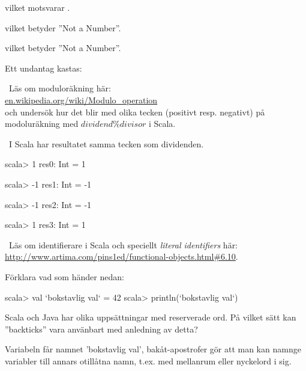 \SubtaskSolved {} vilket motsvarar .

\SubtaskSolved {} vilket betyder ''Not a Number''.

\SubtaskSolved {} vilket betyder ''Not a Number''.

\SubtaskSolved Ett undantag kastas: 

\QUESTEND




\QUESTBEGIN

\Task\Uberkurs \what~Läs om moduloräkning här: \\
 \href{https://en.wikipedia.org/wiki/Modulo\_operation}{en.wikipedia.org/wiki/Modulo\_operation} \\
 och undersök hur det blir med olika tecken (positivt resp. negativt) på modoluräkning med $dividend \% divisor$ i Scala.


\SOLUTION

\TaskSolved \what~I Scala har resultatet samma tecken som dividenden.
\begin{REPL}
scala> 1 %
res0: Int = 1

scala> -1 %
res1: Int = -1

scala> -1 %
res2: Int = -1

scala> 1 %
res3: Int = 1

\end{REPL}

\QUESTEND





\QUESTBEGIN

\Task\Uberkurs \what~Läs om identifierare i Scala och speciellt \emph{literal identifiers} här: \url{http://www.artima.com/pins1ed/functional-objects.html#6.10}.

\Subtask Förklara vad som händer nedan:
\begin{REPLnonum}
scala> val `bokstavlig val` = 42
scala> println(`bokstavlig val`)
\end{REPLnonum}

\Subtask Scala och Java har olika uppsättningar med reserverade ord. På vilket sätt kan ''backticks'' vara använbart med anledning av detta?

\SOLUTION

\TaskSolved \what

\SubtaskSolved Variabeln får namnet 'bokstavlig val', bakåt-apostrofer  gör att man kan namnge variabler till annars otillåtna namn, t.ex. med mellanrum eller nyckelord i sig.

